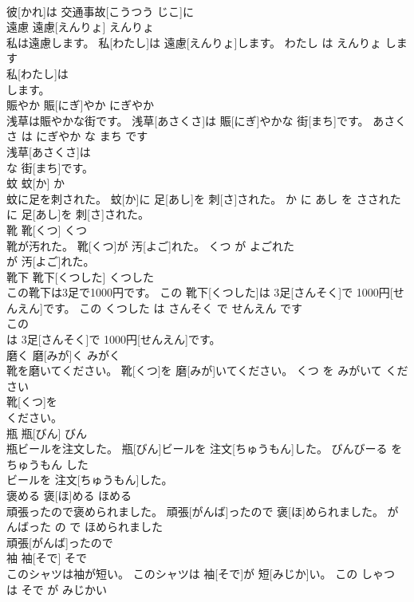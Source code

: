 \documentclass[8pt]{extreport}
\begin{document}
\begin{CJK}{UTF8}{min}
\\	彼[かれ]は 交通事故[こうつう じこ]に
\\	遠慮	遠慮[えんりょ]	えんりょ	
\\	私は遠慮します。	私[わたし]は 遠慮[えんりょ]します。	わたし は えんりょ します	
\\	私[わたし]は
\\	します。			
\\	賑やか	賑[にぎ]やか	にぎやか	
\\	浅草は賑やかな街です。	浅草[あさくさ]は 賑[にぎ]やかな 街[まち]です。	あさくさ は にぎやか な まち です	
\\	浅草[あさくさ]は
\\	な 街[まち]です。			
\\	蚊	蚊[か]	か	
\\	蚊に足を刺された。	蚊[か]に 足[あし]を 刺[さ]された。	か に あし を さされた	
\\	に 足[あし]を 刺[さ]された。			
\\	靴	靴[くつ]	くつ	
\\	靴が汚れた。	靴[くつ]が 汚[よご]れた。	くつ が よごれた	
\\	が 汚[よご]れた。			
\\	靴下	靴下[くつした]	くつした	
\\	この靴下は3足で1000円です。	この 靴下[くつした]は 3足[さんそく]で 1000円[せんえん]です。	この くつした は さんそく で せんえん です	
\\	この
\\	は 3足[さんそく]で 1000円[せんえん]です。			
\\	磨く	磨[みが]く	みがく	
\\	靴を磨いてください。	靴[くつ]を 磨[みが]いてください。	くつ を みがいて ください	
\\	靴[くつ]を
\\	ください。			
\\	瓶	瓶[びん]	びん	
\\	瓶ビールを注文した。	瓶[びん]ビールを 注文[ちゅうもん]した。	びんびーる を ちゅうもん した	
\\	ビールを 注文[ちゅうもん]した。			
\\	褒める	褒[ほ]める	ほめる	
\\	頑張ったので褒められました。	頑張[がんば]ったので 褒[ほ]められました。	がんばった の で ほめられました	
\\	頑張[がんば]ったので
\\	袖	袖[そで]	そで	
\\	このシャツは袖が短い。	このシャツは 袖[そで]が 短[みじか]い。	この しゃつ は そで が みじかい	

\end{CJK}
\end{document}
